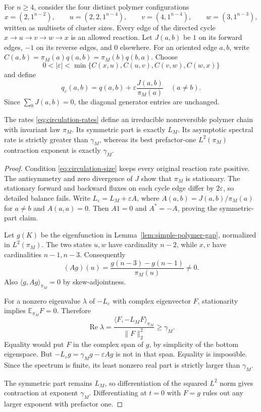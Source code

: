 For $n\ge4$, consider the four distinct polymer configurations
\[
 x=(2,1^{n-2}),\qquad
 u=(2,2,1^{n-4}),\qquad
 v=(4,1^{n-4}),\qquad
 w=(3,1^{n-3}),
\]
written as multisets of cluster sizes.
Every edge of the directed cycle $x\to u\to v\to w\to x$ is an
allowed reaction.  Let $J(a,b)$ be $1$ on its forward edges,
$-1$ on its reverse edges, and $0$ elsewhere.
For an oriented edge $a,b$, write
$C(a,b)=\pi_M(a)q(a,b)=\pi_M(b)q(b,a)$.
Choose
\begin{equation}\label{eq:circulation-size}
 0<|\varepsilon|<
       \min\{C(x,u),C(u,v),C(v,w),C(w,x)\}
\end{equation}
and define
\begin{equation}\label{eq:circulation-rates}
 q_\varepsilon(a,b)
   =q(a,b)+\varepsilon\frac{J(a,b)}{\pi_M(a)}
 \quad(a\ne b).
\end{equation}
Since $\sum_bJ(a,b)=0$, the diagonal generator entries are unchanged.

\begin{proposition}\label{prop:polymer-circulation}
The rates \eqref{eq:circulation-rates} define an irreducible
nonreversible polymer chain with invariant law $\pi_M$.
Its symmetric part is exactly $L_M$.
Its asymptotic spectral rate is strictly greater than $\gamma_M$,
whereas its best prefactor-one $L^2(\pi_M)$ contraction exponent
is exactly $\gamma_M$.
\end{proposition}

\begin{proof}
Condition \eqref{eq:circulation-size} keeps every original reaction
rate positive.  The antisymmetry and zero divergence of $J$ show that
$\pi_M$ is stationary.  The stationary forward and backward fluxes
on each cycle edge differ by $2\varepsilon$, so detailed balance fails.
Write $L_\varepsilon=L_M+\varepsilon A$, where
$A(a,b)=J(a,b)/\pi_M(a)$ for $a\ne b$ and $A(a,a)=0$.
Then $A1=0$ and $A^*=-A$, proving the symmetric-part claim.

Let $g(K)$ be the eigenfunction in Lemma~\ref{lem:simple-polymer-gap},
normalized in $L^2(\pi_M)$.  The two states $u,w$ have cardinality
$n-2$, while $x,v$ have cardinalities $n-1,n-3$.
Consequently
\[
 (Ag)(u)=
   \frac{g(n-3)-g(n-1)}{\pi_M(u)}\ne0.
\]
Also $\langle g,Ag\rangle_{\pi_M}=0$ by skew-adjointness.

For a nonzero eigenvalue $\lambda$ of $-L_\varepsilon$ with complex
eigenvector $F$, stationarity implies $\mathbb E_{\pi_M}F=0$.
Therefore
\[
 \operatorname{Re}\lambda
 =\frac{\langle F,-L_MF\rangle_{\pi_M}}{\|F\|_2^2}
 \ge\gamma_M.
\]
Equality would put $F$ in the complex span of $g$, by simplicity of
the bottom eigenspace.  But
$-L_\varepsilon g=\gamma_Mg-\varepsilon Ag$ is not in that span.
Equality is impossible.  Since the spectrum is finite, its least
nonzero real part is strictly larger than $\gamma_M$.

The symmetric part remains $L_M$, so differentiation of the squared
$L^2$ norm gives contraction at exponent $\gamma_M$.
Differentiating at $t=0$ with $F=g$ rules out any larger exponent
with prefactor one.
\end{proof}


